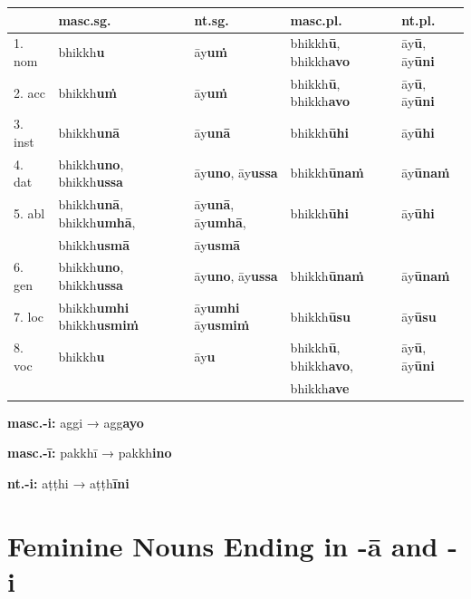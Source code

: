 \documentclass[a4paper]{memoir}
\begin{document}
\begin{center}
\begin{tabular}{lllll}
 & \textbf{masc.sg.} & \textbf{nt.sg.} & \textbf{masc.pl.} & \textbf{nt.pl.}\\[0pt]
\hline
1. nom & bhikkh\textbf{u} & āy\textbf{uṁ} & bhikkh\textbf{ū}, bhikkh\textbf{avo} & āy\textbf{ū}, āy\textbf{ūni}\\[0pt]
2. acc & bhikkh\textbf{uṁ} & āy\textbf{uṁ} & bhikkh\textbf{ū}, bhikkh\textbf{avo} & āy\textbf{ū}, āy\textbf{ūni}\\[0pt]
3. inst & bhikkh\textbf{unā} & āy\textbf{unā} & bhikkh\textbf{ūhi} & āy\textbf{ūhi}\\[0pt]
4. dat & bhikkh\textbf{uno}, bhikkh\textbf{ussa} & āy\textbf{uno}, āy\textbf{ussa} & bhikkh\textbf{ūnaṁ} & āy\textbf{ūnaṁ}\\[0pt]
5. abl & bhikkh\textbf{unā}, bhikkh\textbf{umhā}, & āy\textbf{unā}, āy\textbf{umhā}, & bhikkh\textbf{ūhi} & āy\textbf{ūhi}\\[0pt]
 & bhikkh\textbf{usmā} & āy\textbf{usmā} &  & \\[0pt]
6. gen & bhikkh\textbf{uno}, bhikkh\textbf{ussa} & āy\textbf{uno}, āy\textbf{ussa} & bhikkh\textbf{ūnaṁ} & āy\textbf{ūnaṁ}\\[0pt]
7. loc & bhikkh\textbf{umhi} bhikkh\textbf{usmiṁ} & āy\textbf{umhi} āy\textbf{usmiṁ} & bhikkh\textbf{ūsu} & āy\textbf{ūsu}\\[0pt]
8. voc & bhikkh\textbf{u} & āy\textbf{u} & bhikkh\textbf{ū}, bhikkh\textbf{avo}, & āy\textbf{ū}, āy\textbf{ūni}\\[0pt]
 &  &  & bhikkh\textbf{ave} & \\[0pt]
\end{tabular}
\end{center}

\textbf{masc.-i:} aggi → agg\textbf{ayo}

\textbf{masc.-ī:} pakkhī → pakkh\textbf{ino}

\textbf{nt.-i:} aṭṭhi → aṭṭh\textbf{īni}

\section{Feminine Nouns Ending in -ā and -i}
\label{sec:org96141ba}
\end{document}
